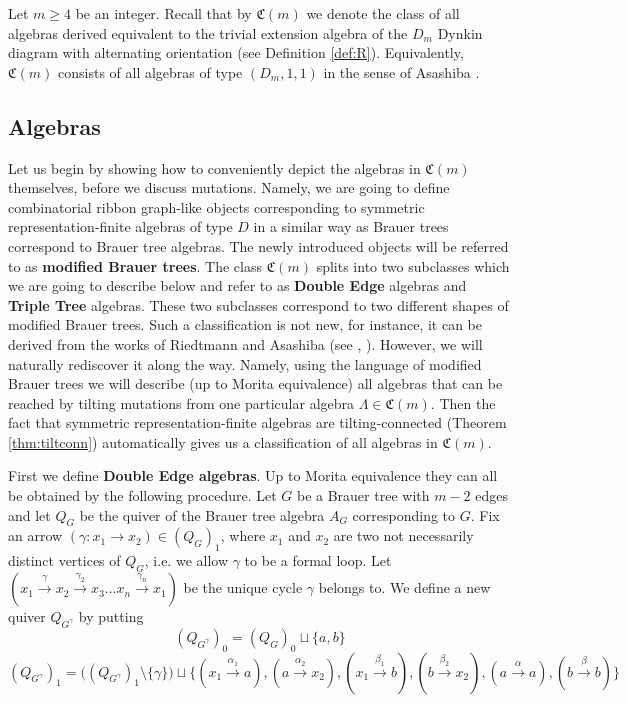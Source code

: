 \documentclass[12pt]{amsart}
\theoremstyle{plain}
\theoremstyle{remark}
\theoremstyle{definition}
\begin{document}
Let $m \geq 4$ be an integer. Recall that by $\mathfrak{C}(m)$ we denote the class of all algebras derived equivalent to the trivial extension algebra of the $D_m$ Dynkin diagram with alternating orientation (see Definition \ref{def:R}). Equivalently, $\mathfrak{C}(m)$ consists of all algebras of type $(D_m, 1, 1)$ in the sense of Asashiba \cite{A}. 

\subsection{Algebras}

Let us begin by showing how to conveniently depict the algebras in $\mathfrak{C}(m)$ themselves, before we discuss mutations. Namely, we are going to define combinatorial ribbon graph-like objects corresponding to symmetric representation-finite algebras of type $D$ in a similar way as Brauer trees correspond to Brauer tree algebras. The newly introduced objects will be referred to as {\bf modified Brauer trees}. The class $\mathfrak{C}(m)$ splits into two subclasses which we are going to describe below and refer to as {\bf Double Edge} algebras and {\bf Triple Tree} algebras. These two subclasses correspond to two different shapes of modified Brauer trees. Such a classification is not new, for instance, it can be derived from the works of Riedtmann and Asashiba (see \cite{Ried}, \cite{A}). However, we will naturally rediscover it along the way. Namely, using the language of modified Brauer trees we will describe (up to Morita equivalence) all algebras that can be reached by tilting mutations from one particular algebra $\Lambda \in \mathfrak{C}(m)$. Then the fact that symmetric representation-finite algebras are tilting-connected (Theorem \ref{thm:tiltconn}) automatically gives us a classification of all algebras in $\mathfrak{C}(m)$. 

First we define {\bf Double Edge algebras}. Up to Morita equivalence they can all be obtained by the following procedure. Let $G$ be a Brauer tree with $m-2$ edges and let $Q_G$ be the quiver of the Brauer tree algebra $A_G$ corresponding to $G$. Fix an arrow ${(\gamma \colon x_1 \to x_2) \in (Q_G)_1}$, where $x_1$ and $x_2$ are two not necessarily distinct vertices of $Q_G$, i.e. we allow $\gamma$ to be a formal loop. Let $(x_1 \xrightarrow{\gamma} x_2 \xrightarrow{\gamma_2} x_3 \dots x_n \xrightarrow{\gamma_n} x_1)$ be the unique cycle $\gamma$ belongs to. We define a new quiver $Q_{G^\gamma}$ by putting $$(Q_{G^\gamma})_0 = (Q_G)_0 \sqcup \{a,b\}$$ $$(Q_{G^\gamma})_1 = \bigg((Q_{G^\gamma})_1 \setminus \{\gamma\} \bigg) \sqcup \{(x_1 \xrightarrow{\alpha_1} a), (a \xrightarrow{\alpha_2 } x_2), (x_1 \xrightarrow{\beta_1} b),  (b \xrightarrow{\beta_2} x_2), (a \xrightarrow{\alpha} a), (b \xrightarrow{\beta} b) \}$$
\end{document}

